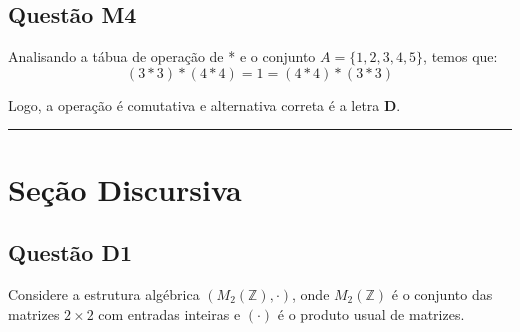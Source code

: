 \documentclass{article}
\begin{document}
\subsection{Questão M4}
Analisando a tábua de operação de * e o conjunto $A = \{1, 2, 3, 4, 5\}$, temos que:
\[
(3*3)*(4*4) = 1 = (4*4)*(3*3) 
\]

Logo, a operação é comutativa e alternativa correta é a letra \textbf{D}.

\vspace{0.5em}
\hrule
\vspace{0.5em}

\section{Seção Discursiva}

\subsection{Questão D1}
Considere a estrutura algébrica $(M_2(\mathbb{Z}), \cdot)$, onde $M_2(\mathbb{Z})$ é o conjunto das matrizes $2 \times 2$ com entradas inteiras e $(\cdot)$ é o produto usual de matrizes.
\end{document}
